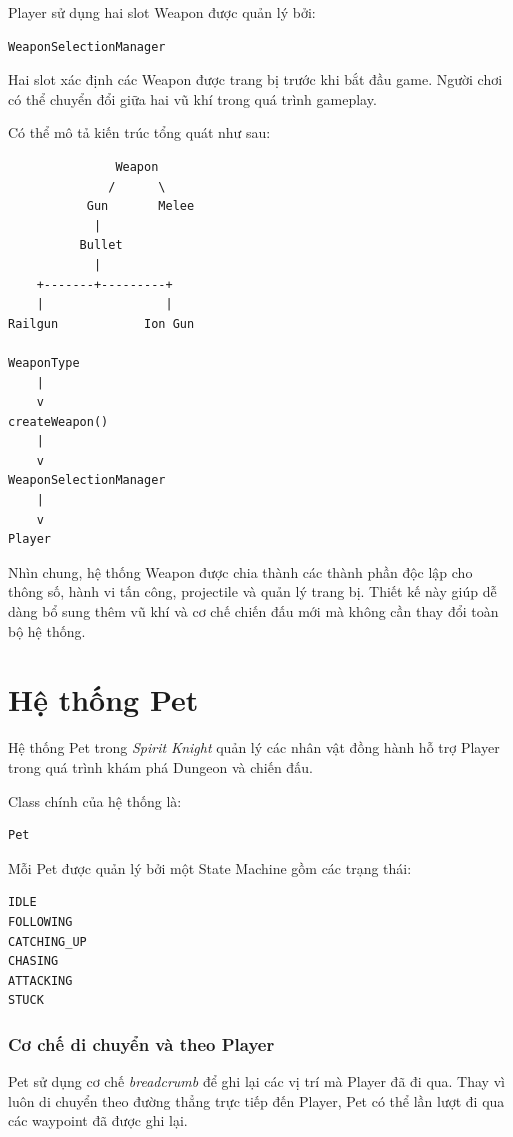 \documentclass[12pt,a4paper]{report}
\begin{document}
    Player sử dụng hai slot Weapon được quản lý bởi:

    \begin{verbatim}
WeaponSelectionManager
    \end{verbatim}

    Hai slot xác định các Weapon được trang bị trước khi bắt đầu game.
    Người chơi có thể chuyển đổi giữa hai vũ khí trong quá trình
    gameplay.

    Có thể mô tả kiến trúc tổng quát như sau:

    \begin{verbatim}
               Weapon
              /      \
           Gun       Melee
            |
          Bullet
            |
    +-------+---------+
    |                 |
Railgun            Ion Gun

WeaponType
    |
    v
createWeapon()
    |
    v
WeaponSelectionManager
    |
    v
Player
    \end{verbatim}

    Nhìn chung, hệ thống Weapon được chia thành các thành phần độc lập
    cho thông số, hành vi tấn công, projectile và quản lý trang bị.
    Thiết kế này giúp dễ dàng bổ sung thêm vũ khí và cơ chế chiến đấu
    mới mà không cần thay đổi toàn bộ hệ thống.


    \chapter{Hệ thống Pet}

    Hệ thống Pet trong \textit{Spirit Knight} quản lý các nhân vật
    đồng hành hỗ trợ Player trong quá trình khám phá Dungeon và
    chiến đấu.

    Class chính của hệ thống là:

    \begin{verbatim}
Pet
    \end{verbatim}

    Mỗi Pet được quản lý bởi một State Machine gồm các trạng thái:

    \begin{verbatim}
IDLE
FOLLOWING
CATCHING_UP
CHASING
ATTACKING
STUCK
    \end{verbatim}

    \subsection{Cơ chế di chuyển và theo Player}

    Pet sử dụng cơ chế \textit{breadcrumb} để ghi lại các vị trí mà
    Player đã đi qua. Thay vì luôn di chuyển theo đường thẳng trực tiếp
    đến Player, Pet có thể lần lượt đi qua các waypoint đã được ghi lại.
\end{document}
